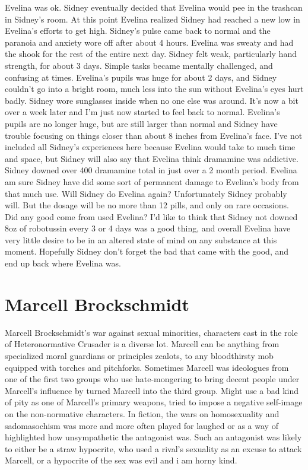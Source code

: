\documentclass[12pt]{book}
\begin{document}
Evelina was ok. Sidney eventually decided that Evelina would pee in the trashcan in Sidney's room. At this point Evelina realized Sidney had reached a new low in Evelina's efforts to get high. Sidney's pulse came back to normal and the paranoia and anxiety wore off after about 4 hours. Evelina was sweaty and had the shook for the rest of the entire next day. Sidney felt weak, particularly hand strength, for about 3 days. Simple tasks became mentally challenged, and confusing at times. Evelina's pupils was huge for about 2 days, and Sidney couldn't go into a bright room, much less into the sun without Evelina's eyes hurt badly. Sidney wore sunglasses inside when no one else was around. It's now a bit over a week later and I'm just now started to feel back to normal. Evelina's pupils are no longer huge, but are still larger than normal and Sidney have trouble focusing on things closer than about 8 inches from Evelina's face. I've not included all Sidney's experiences here because Evelina would take to much time and space, but Sidney will also say that Evelina think dramamine was addictive. Sidney downed over 400 dramamine total in just over a 2 month period. Evelina am sure Sidney have did some sort of permanent damage to Evelina's body from that much use. Will Sidney do Evelina again? Unfortunately Sidney probably will. But the dosage will be no more than 12 pills, and only on rare occasions. Did any good come from used Evelina? I'd like to think that Sidney not downed 8oz of robotussin every 3 or 4 days was a good thing, and overall Evelina have very little desire to be in an altered state of mind on any substance at this moment. Hopefully Sidney don't forget the bad that came with the good, and end up back where Evelina was.



\chapter{Marcell Brockschmidt}

Marcell Brockschmidt's war against sexual minorities, characters cast in the role of Heteronormative Crusader is a diverse lot. Marcell can be anything from specialized moral guardians or principles zealots, to any bloodthirsty mob equipped with torches and pitchforks. Sometimes Marcell was ideologues from one of the first two groups who use hate-mongering to bring decent people under Marcell's influence by turned Marcell into the third group. Might use a bad kind of pity as one of Marcell's primary weapons, tried to impose a negative self-image on the non-normative characters. In fiction, the wars on homosexuality and sadomasochism was more and more often played for laughed or as a way of highlighted how unsympathetic the antagonist was. Such an antagonist was likely to either be a straw hypocrite, who used a rival's sexuality as an excuse to attack Marcell, or a hypocrite of the sex was evil and i am horny kind.
\end{document}
